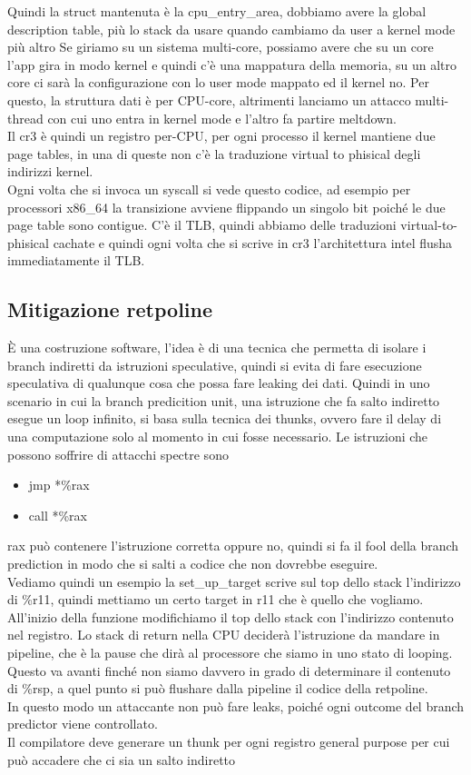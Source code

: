 \documentclass[12pt, oneside]{extbook} %
\begin{document}
Quindi la struct mantenuta è la \textsf{cpu\_entry\_area}, dobbiamo avere la global description table, più lo stack da usare quando cambiamo da user a kernel mode più altro
Se giriamo su un sistema multi-core, possiamo avere che su un core l'app gira in modo kernel e quindi c'è una mappatura della memoria, su un altro core ci sarà la configurazione con lo user mode mappato ed il kernel no. Per questo, la struttura dati è per CPU-core, altrimenti lanciamo un attacco multi-thread con cui uno entra in kernel mode e l'altro fa partire meltdown.\\ Il cr3 è quindi un registro per-CPU, per ogni processo il kernel mantiene due page tables, in una di queste non c'è la traduzione virtual to phisical degli indirizzi kernel.\\ Ogni volta che si invoca un syscall si vede questo codice, ad esempio per processori x86\_64
la transizione avviene flippando un singolo bit poiché le due page table sono contigue. C'è il TLB, quindi abbiamo delle traduzioni virtual-to-phisical cachate e quindi ogni volta che si scrive in cr3 l'architettura intel flusha immediatamente il TLB.
\subsection{Mitigazione retpoline}
È una costruzione software, l'idea è di una tecnica che permetta di isolare i branch indiretti da istruzioni speculative, quindi si evita di fare esecuzione speculativa di qualunque cosa che possa fare leaking dei dati. Quindi in uno scenario in cui la branch predicition unit, una istruzione che fa salto indiretto esegue un loop infinito, si basa sulla tecnica dei thunks, ovvero fare il delay di una computazione solo al momento in cui fosse necessario. Le istruzioni che possono soffrire di attacchi spectre sono
\begin{itemize}
\item jmp *\%rax
\item call *\%rax
\end{itemize}
rax può contenere l'istruzione corretta oppure no, quindi si fa il fool della branch prediction in modo che si salti a codice che non dovrebbe eseguire.\\Vediamo quindi un esempio
la \textsf{set\_up\_target} scrive sul top dello stack l'indirizzo di \%r11, quindi mettiamo un certo target in r11 che è quello che vogliamo. All'inizio della funzione modifichiamo il top dello stack con l'indirizzo contenuto nel registro. Lo stack di return nella CPU deciderà l'istruzione da mandare in pipeline, che è la pause che dirà al processore che siamo in uno stato di looping. Questo va avanti finché non siamo davvero in grado di determinare il contenuto di \%rsp, a quel punto si può flushare dalla pipeline il codice della retpoline.\\In questo modo un attaccante non può fare leaks, poiché ogni outcome del branch predictor viene controllato.\\Il compilatore deve generare un thunk per ogni registro general purpose per cui può accadere che ci sia un salto indiretto
\end{document}
